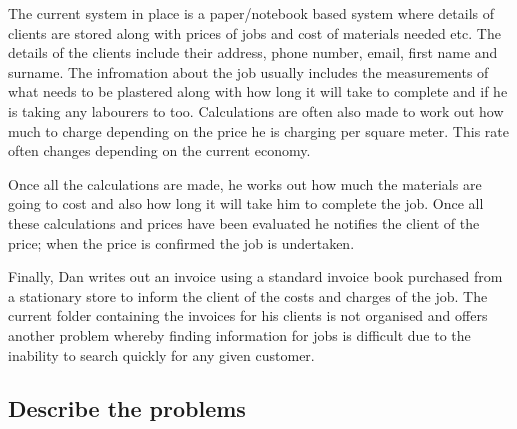 	\begin{flushleft}

	The current system in place is a paper/notebook based system where details of clients are stored along with prices of jobs and cost of materials needed etc. The details of the clients include their address, phone number, email, first name and surname. The infromation about the job usually includes the measurements of what needs to be plastered along with how long it will take to complete and if he is taking any labourers to too. Calculations are often also made to work out how much to charge depending on the price he is charging per square meter. This rate often changes depending on the current economy. \par

Once all the calculations are made, he works out how much the materials are going to cost and also how long it will take him to complete the job. Once all these calculations and prices have been evaluated he notifies the client of the price; when the price is confirmed the job is undertaken.	 \par

Finally, Dan writes out an invoice using a standard invoice book purchased from a stationary store to inform the client of the costs and charges of the job. The current folder containing the invoices for his clients is not organised and offers another problem whereby finding information for jobs is difficult due to the inability to search quickly for any given customer.
		
	




	\end{flushleft}

\subsection{Describe the problems}


